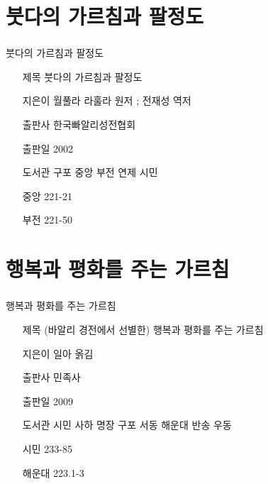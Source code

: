 \documentclass[aspectratio=1610,17pt,xcolor=pdftex,dvipsnames,table,handout]{beamer}
\begin{document}
		\section{ 붓다의 가르침과 팔정도 }
		\begin{frame} [t,plain]
		\frametitle{}
			\begin{block} { 붓다의 가르침과 팔정도 }
			\setlength{\leftmargini}{4em}			
			\begin{itemize}
				\item [제목]  	붓다의 가르침과 팔정도 
				\item [지은이]	월풀라 라훌라 원저 ; 전재성 역저
				\item [출판사]	한국빠알리성전협회 
				\item [출판일]	2002
				\item [도서관]		구포 중앙 부전 연제 시민
				\item [중앙]		221-21
				\item [부전]		221-50
			\end{itemize}
			\end{block}						
		\end{frame}						


		\section{ 행복과 평화를 주는 가르침 }
		\begin{frame} [t,plain]
		\frametitle{}
			\begin{block} { 행복과 평화를 주는 가르침 }
			\setlength{\leftmargini}{4em}			
			\begin{itemize}
				\item [제목]  	(바알리 경전에서 선별한) 행복과 평화를 주는 가르침 
				\item [지은이]	일아 옭김
				\item [출판사]	민족사
				\item [출판일]	2009
				\item [도서관]	시민 사하 명장 구포 서동 해운대 반송 우동 
				\item [시민]		233-85
				\item [해운대]	223.1-3
			\end{itemize}
			\end{block}						
		\end{frame}						
\end{document}
